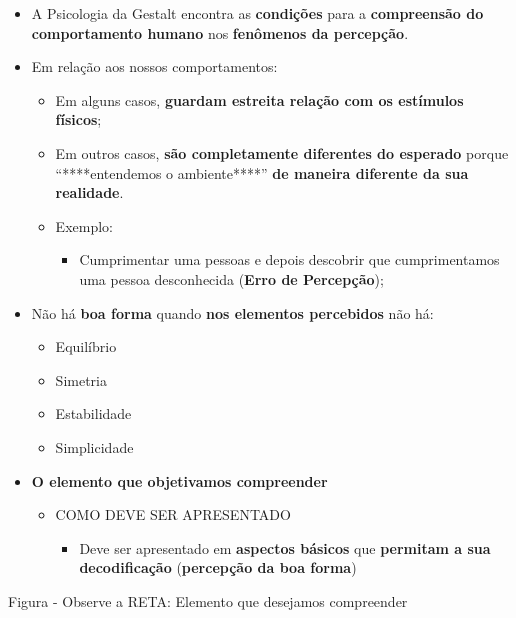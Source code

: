 \documentclass[
]{book}
\providecommand{\tightlist}{%
  \setlength{\itemsep}{0pt}\setlength{\parskip}{0pt}}
\begin{document}
\begin{itemize}
\tightlist
\item
  A Psicologia da Gestalt encontra as \textbf{condições} para a \textbf{compreensão do comportamento humano} nos \textbf{fenômenos da percepção}.
\item
  Em relação aos nossos comportamentos:

  \begin{itemize}
  \tightlist
  \item
    Em alguns casos, \textbf{guardam estreita relação com os estímulos físicos};
  \item
    Em outros casos, \textbf{são completamente diferentes do esperado} porque ``****entendemos o ambiente****'' \textbf{de maneira diferente da sua realidade}.
  \item
    Exemplo:

    \begin{itemize}
    \tightlist
    \item
      Cumprimentar uma pessoas e depois descobrir que cumprimentamos uma pessoa desconhecida (\textbf{Erro de Percepção});
    \end{itemize}
  \end{itemize}
\item
  Não há \textbf{boa forma} quando \textbf{nos elementos percebidos} não há:

  \begin{itemize}
  \tightlist
  \item
    Equilíbrio
  \item
    Simetria
  \item
    Estabilidade
  \item
    Simplicidade
  \end{itemize}
\item
  \textbf{O elemento que objetivamos compreender}

  \begin{itemize}
  \tightlist
  \item
    COMO DEVE SER APRESENTADO

    \begin{itemize}
    \tightlist
    \item
      Deve ser apresentado em \textbf{aspectos básicos} que \textbf{permitam a sua decodificação} (\textbf{percepção da boa forma})
    \end{itemize}
  \end{itemize}
\end{itemize}

Figura - Observe a RETA: Elemento que desejamos compreender
\end{document}

